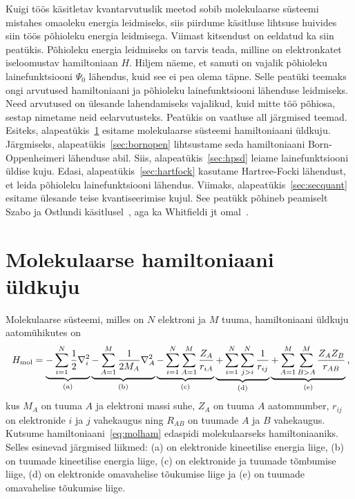 \documentclass[12pt]{report}
\begin{document}
Kuigi töös käsitletav kvantarvutuslik meetod sobib molekulaarse süsteemi mistahes omaoleku energia leidmiseks, siis piirdume käsitluse lihtsuse huivides siin töös põhioleku energia leidmisega.
Viimast kitsendust on eeldatud ka siin peatükis.
Põhioleku energia leidmiseks on tarvis teada, milline on elektronkatet iseloomustav hamiltoniaan \(H\).
Hiljem näeme, et samuti on vajalik põhioleku lainefunktsiooni $\Psi_0$ lähendus, kuid see ei pea olema täpne.
Selle peatüki teemaks ongi arvutused hamiltoniaani ja põhioleku lainefunktsiooni lähenduse leidmiseks.
Need arvutused on ülesande lahendamiseks vajalikud, kuid mitte töö põhiosa, sestap nimetame neid eelarvutusteks.
Peatükis on vaatluse all järgmised teemad.
Esiteks, alapeatükis~\ref{sec:molhamgen} esitame molekulaarse süsteemi hamiltoniaani üld\-kuju.
Järgmiseks, alapeatükis~\ref{sec:bornopen} lihtsustame seda hamiltoniaani Born-Oppenheimeri lähenduse abil.
Siis, alapeatükis~\ref{sec:hpsd} leiame lainefunktsiooni üldise kuju.
Edasi, alapeatükis~\ref{sec:hartfock} kasutame Hartree-Focki lähendust, et leida põhioleku lainefunktsiooni lähendus.
Viimaks, alapeatükis~\ref{sec:secquant} esitame ülesande teise kvantiseerimise kujul.
See peatükk põhineb peamiselt Szabo ja Ostlundi käsitlusel~\cite{szabo+ostlund}, aga ka Whitfieldi jt omal~\cite{whitfield+etal2011}.

\section{Molekulaarse hamiltoniaani üldkuju}\label{sec:molhamgen}

Molekulaarse süsteemi, milles on \(N\) elektroni ja \(M\) tuuma, hamiltoniaani üldkuju aatom\-ühikutes on
\begin{align}\label{eq:molham}
    H_\text{mol} =
    \underbrace{- \sum_{i = 1}^N \frac{1}{2} \nabla_i^2}_\text{(a)}
    \underbrace{- \sum_{A = 1}^M \frac{1}{2 M_A} \nabla_A^2}_\text{(b)}
    \underbrace{- \sum_{i = 1}^N \sum_{A = 1}^M \frac{Z_A}{r_{iA}}}_\text{(c)}
    \underbrace{+ \sum_{i = 1}^N \sum_{j > i}^N \frac{1}{r_{ij}}}_\text{(d)}
    \underbrace{+ \sum_{A = 1}^M \sum_{B > A}^M \frac{Z_A Z_B}{r_{AB}}}_\text{(e)} \rlap{,}
\end{align}
kus \(M_A\) on tuuma \(A\) ja elektroni massi suhe, \(Z_A\) on tuuma \(A\) aatomnumber, \(r_{ij}\) on elektronide \(i\) ja \(j\) vahekaugus ning \(R_{AB}\) on tuumade \(A\) ja \(B\) vahekaugus.
Kutsume hamiltoniaani~\eqref{eq:molham} edaspidi molekulaarseks hamiltoniaaniks.
Selles esinevad järgmised liikmed: (a) on elektronide kineetilise energia liige, (b) on tuumade kineetilise energia liige, (c) on elektronide ja tuumade tõmbumise liige, (d) on elektronide omavahelise tõukumise liige ja (e) on tuumade omavahelise tõukumise liige.
\end{document}
